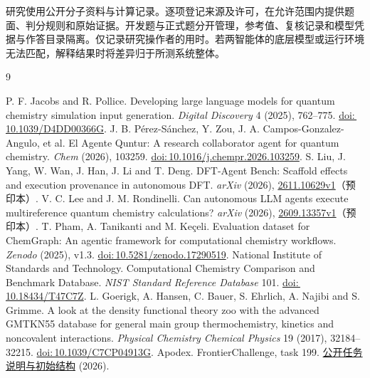 \documentclass[12pt,a4paper]{article}
\newcommand{\doi}[1]{\href{https://doi.org/#1}{doi:\,#1}}
\begin{document}
研究使用公开分子资料与计算记录。逐项登记来源及许可，在允许范围内提供题面、判分规则和原始证据。开发题与正式题分开管理，参考值、复核记录和模型凭据与作答目录隔离。仅记录研究操作者的用时。若两智能体的底层模型或运行环境无法匹配，解释结果时将差异归于所测系统整体。

\clearpage
\renewcommand{\bibsection}{\section{参考文献}}
\setlength{\bibsep}{0.7em}
\begin{thebibliography}{9}
\raggedright
{}
P. F. Jacobs and R. Pollice. Developing large language models for quantum chemistry simulation input generation.
\emph{Digital Discovery} 4 (2025), 762--775. \doi{10.1039/D4DD00366G}.
J. B. P\'erez-S\'anchez, Y. Zou, J. A. Campos-Gonzalez-Angulo, et al. El Agente Quntur: A research collaborator agent for quantum chemistry.
\emph{Chem} (2026), 103259. \doi{10.1016/j.chempr.2026.103259}.
S. Liu, J. Yang, W. Wan, J. Han, J. Li and T. Deng. DFT-Agent Bench: Scaffold effects and execution provenance in autonomous DFT.
\emph{arXiv} (2026), \href{https://arxiv.org/abs/2611.10629v1}{2611.10629v1}（预印本）.
V. C. Lee and J. M. Rondinelli. Can autonomous LLM agents execute multireference quantum chemistry calculations?
\emph{arXiv} (2026), \href{https://arxiv.org/abs/2609.13357v1}{2609.13357v1}（预印本）.
T. Pham, A. Tanikanti and M. Ke\c{c}eli. Evaluation dataset for ChemGraph: An agentic framework for computational chemistry workflows.
\emph{Zenodo} (2025), v1.3. \doi{10.5281/zenodo.17290519}.
National Institute of Standards and Technology. Computational Chemistry Comparison and Benchmark Database.
\emph{NIST Standard Reference Database} 101. \doi{10.18434/T47C7Z}.
L. Goerigk, A. Hansen, C. Bauer, S. Ehrlich, A. Najibi and S. Grimme. A look at the density functional theory zoo with the advanced GMTKN55 database for general main group thermochemistry, kinetics and noncovalent interactions.
\emph{Physical Chemistry Chemical Physics} 19 (2017), 32184--32215. \doi{10.1039/C7CP04913G}.
Apodex. FrontierChallenge, task 199.
\href{https://huggingface.co/datasets/apodex/FrontierChallenge/tree/main/tasks/task_199_b3lyp_opt_freq_minimum}{公开任务说明与初始结构} (2026).
\end{thebibliography}
\end{document}

